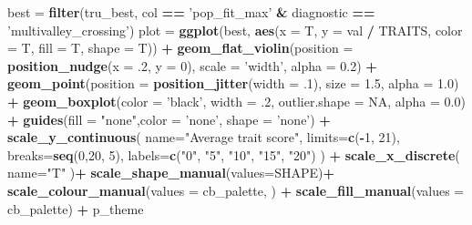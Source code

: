 \documentclass[]{book}
\newenvironment{Shaded}{\begin{snugshade}}{\end{snugshade}}
\newcommand{\DataTypeTok}[1]{\textcolor[rgb]{0.13,0.29,0.53}{#1}}
\newcommand{\DecValTok}[1]{\textcolor[rgb]{0.00,0.00,0.81}{#1}}
\newcommand{\FloatTok}[1]{\textcolor[rgb]{0.00,0.00,0.81}{#1}}
\newcommand{\KeywordTok}[1]{\textcolor[rgb]{0.13,0.29,0.53}{\textbf{#1}}}
\newcommand{\NormalTok}[1]{#1}
\newcommand{\OperatorTok}[1]{\textcolor[rgb]{0.81,0.36,0.00}{\textbf{#1}}}
\newcommand{\OtherTok}[1]{\textcolor[rgb]{0.56,0.35,0.01}{#1}}
\newcommand{\StringTok}[1]{\textcolor[rgb]{0.31,0.60,0.02}{#1}}
\begin{document}
\begin{Shaded}
\begin{Highlighting}[]
\NormalTok{best =}\StringTok{ }\KeywordTok{filter}\NormalTok{(tru_best, col }\OperatorTok{==}\StringTok{ 'pop_fit_max'} \OperatorTok{&}\StringTok{ }\NormalTok{diagnostic }\OperatorTok{==}\StringTok{ 'multivalley_crossing'}\NormalTok{)}
\NormalTok{plot =}\StringTok{  }\KeywordTok{ggplot}\NormalTok{(best, }\KeywordTok{aes}\NormalTok{(}\DataTypeTok{x =}\NormalTok{ T, }\DataTypeTok{y =}\NormalTok{ val }\OperatorTok{/}\StringTok{ }\NormalTok{TRAITS, }\DataTypeTok{color =}\NormalTok{ T, }\DataTypeTok{fill =}\NormalTok{ T, }\DataTypeTok{shape =}\NormalTok{ T)) }\OperatorTok{+}
\StringTok{          }\KeywordTok{geom_flat_violin}\NormalTok{(}\DataTypeTok{position =} \KeywordTok{position_nudge}\NormalTok{(}\DataTypeTok{x =} \FloatTok{.2}\NormalTok{, }\DataTypeTok{y =} \DecValTok{0}\NormalTok{), }\DataTypeTok{scale =} \StringTok{'width'}\NormalTok{, }\DataTypeTok{alpha =} \FloatTok{0.2}\NormalTok{) }\OperatorTok{+}
\StringTok{          }\KeywordTok{geom_point}\NormalTok{(}\DataTypeTok{position =} \KeywordTok{position_jitter}\NormalTok{(}\DataTypeTok{width =} \FloatTok{.1}\NormalTok{), }\DataTypeTok{size =} \FloatTok{1.5}\NormalTok{, }\DataTypeTok{alpha =} \FloatTok{1.0}\NormalTok{) }\OperatorTok{+}
\StringTok{          }\KeywordTok{geom_boxplot}\NormalTok{(}\DataTypeTok{color =} \StringTok{'black'}\NormalTok{, }\DataTypeTok{width =} \FloatTok{.2}\NormalTok{, }\DataTypeTok{outlier.shape =} \OtherTok{NA}\NormalTok{, }\DataTypeTok{alpha =} \FloatTok{0.0}\NormalTok{) }\OperatorTok{+}
\StringTok{          }\KeywordTok{guides}\NormalTok{(}\DataTypeTok{fill =} \StringTok{"none"}\NormalTok{,}\DataTypeTok{color =} \StringTok{'none'}\NormalTok{, }\DataTypeTok{shape =} \StringTok{'none'}\NormalTok{) }\OperatorTok{+}
\StringTok{          }\KeywordTok{scale_y_continuous}\NormalTok{(}
            \DataTypeTok{name=}\StringTok{"Average trait score"}\NormalTok{,}
            \DataTypeTok{limits=}\KeywordTok{c}\NormalTok{(}\OperatorTok{-}\DecValTok{1}\NormalTok{, }\DecValTok{21}\NormalTok{),}
            \DataTypeTok{breaks=}\KeywordTok{seq}\NormalTok{(}\DecValTok{0}\NormalTok{,}\DecValTok{20}\NormalTok{, }\DecValTok{5}\NormalTok{),}
            \DataTypeTok{labels=}\KeywordTok{c}\NormalTok{(}\StringTok{"0"}\NormalTok{, }\StringTok{"5"}\NormalTok{, }\StringTok{"10"}\NormalTok{, }\StringTok{"15"}\NormalTok{, }\StringTok{"20"}\NormalTok{)}
\NormalTok{          ) }\OperatorTok{+}
\StringTok{          }\KeywordTok{scale_x_discrete}\NormalTok{(}
            \DataTypeTok{name=}\StringTok{"T"}
\NormalTok{          )}\OperatorTok{+}
\StringTok{          }\KeywordTok{scale_shape_manual}\NormalTok{(}\DataTypeTok{values=}\NormalTok{SHAPE)}\OperatorTok{+}
\StringTok{          }\KeywordTok{scale_colour_manual}\NormalTok{(}\DataTypeTok{values =}\NormalTok{ cb_palette, ) }\OperatorTok{+}
\StringTok{          }\KeywordTok{scale_fill_manual}\NormalTok{(}\DataTypeTok{values =}\NormalTok{ cb_palette) }\OperatorTok{+}
\StringTok{          }\NormalTok{p_theme}


\end{Highlighting}
\end{Shaded}
\end{document}
